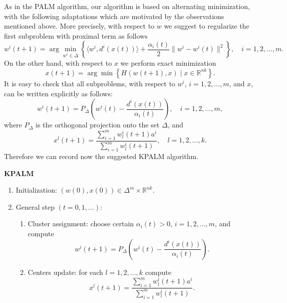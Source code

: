 \documentclass[11pt]{article}
\numberwithin{equation}{section}
\begin{document}
As in the PALM algorithm, our algorithm is based on alternating minimization, with the following adaptations which are motivated by the observations mentioned above. More precisely, with respect to $w$ we suggest to regularize the first subproblem with proximal term as follows
\begin{equation}
	w^i(t+1) = \arg\!\min\limits_{w^i \in \Delta} \left\lbrace \langle w^i , d^i(x(t)) \rangle + \frac{\alpha_i(t)}{2} \|w^i - w^i(t)\|^2 \right\rbrace, \quad i=1,2, \ldots, m . \label{State_w_update}
\end{equation}
On the other hand, with respect to $x$ we perform exact minimization
\begin{equation}
	x(t+1) = \arg\!\min \left\lbrace H(w(t+1), x) \mid x \in \mathbb{R}^{nk} \right\rbrace . \label{State_x_update}
\end{equation}
It is easy to check that all subproblems, with respect to $w^i$, $i=1,2, \ldots, m$, and $x$, can be written explicitly  as follows:
\begin{equation}
w^i(t+1) = P_{\Delta} \left(w^i(t) - \frac{d^i(x(t))}{\alpha_i(t)}\right) , \quad i=1, 2, \ldots ,m , \label{StateEq7}
\end{equation}
where $P_{\Delta}$ is the orthogonal projection onto the set $\Delta$, and
\begin{equation}
x^l(t+1) = \frac{\sum_{i=1}^{m} w^i_l(t+1) a^i}{\sum_{i=1}^{m} w^i_l(t+1)} , \quad l=1, 2, \ldots ,k . \label{StateEq8}
\end{equation}
\newpage
Therefore we can record now the suggested KPALM algorithm.
\begin{framed}
\noindent \textbf{KPALM}
\begin{enumerate}[(1)]
	\item Initialization: $(w(0),x(0)) \in \Delta^m \times \mathbb{R}^{nk} .$
	\item General step $\left( t=0,1, \ldots \right)$:
	\begin{enumerate}[(2.1)]
		\item Cluster assignment: choose certain $\alpha_i(t) > 0$, $i=1,2, \ldots, m$, and compute
		\begin{equation}
			w^i(t+1) = P_{\Delta} \left(w^i(t) - \frac{d^i(x(t))}{\alpha_i(t)}\right) . \label{StateEq5}
		\end{equation}
		\item Centers update: for each $l=1, 2, \ldots ,k$ compute
		\begin{equation}
			x^l(t+1) = \frac{\sum_{i=1}^{m} w^i_l(t+1) a^i}{\sum_{i=1}^{m} w^i_l(t+1)} . \label{StateEq6}
		\end{equation}
	\end{enumerate}
\end{enumerate}
\end{framed}
\end{document}
